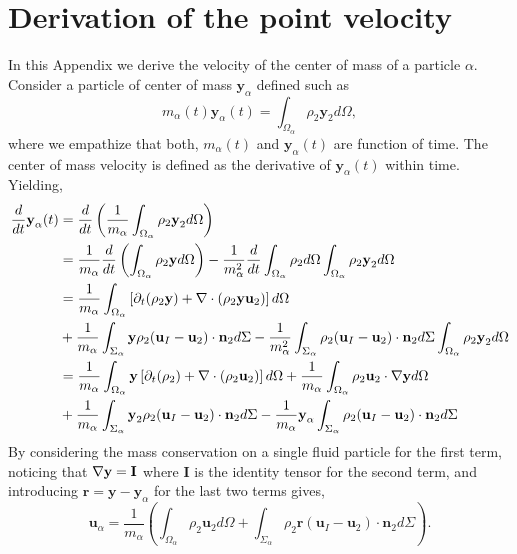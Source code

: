 \section{Derivation of the point velocity}
\label{ap:velocity_definition}
In this Appendix we derive the velocity of the center of mass of a particle $\alpha$. Consider a particle of center of mass $\textbf{y}_\alpha$ defined such as
\begin{equation*}
    m_\alpha(t) \textbf{y}_\alpha(t)
    = \int_{\Omega_\alpha} \rho_2 \textbf{y}_2 d\Omega,
\end{equation*}
where we empathize that both, $m_\alpha(t)$ and $\textbf{y}_\alpha(t)$ are function of time. 
The center of mass velocity is defined as the derivative of $\textbf{y}_\alpha(t)$ within time.
Yielding, 
\begin{align*}
    \frac{d}{d t} \textbf{y}_\alpha (t)
    &=
    \frac{d}{d t} \left(
        \frac{1}{m_\alpha} \int_{\Omega_\alpha} \rho_2 \textbf{y}_2 d\Omega
    \right)\\
    &= \frac{1}{m_\alpha}
    \frac{d}{d t} 
    \left(
        \int_{\Omega_\alpha} \rho_2 \textbf{y} d\Omega
    \right)
    - \frac{1}{m_\alpha^2} \frac{d}{d t} \int_{\Omega_\alpha} \rho_2 d\Omega \int_{\Omega_\alpha} \rho_2 \textbf{y}_2 d\Omega
    \\
    &= \frac{1}{m_\alpha}\int_{\Omega_\alpha} \left[
        \partial_t (\rho_2 \textbf{y}) + \mathbf{\nabla}\cdot\left(\rho_2 \textbf{y}\textbf{u}_2\right) 
    \right]d\Omega \\
    &+ \frac{1}{m_\alpha}\int_{\Sigma_\alpha} \textbf{y} \rho_2(\textbf{u}_I   - \textbf{u}_2) \cdot \textbf{n}_2 d \Sigma
    -  \frac{1}{m_\alpha^2} \int_{\Sigma_\alpha} \rho_2(\textbf{u}_I   - \textbf{u}_2) \cdot \textbf{n}_2 d\Sigma  \int_{\Omega_\alpha} \rho_2 \textbf{y}_2 d\Omega
    \\
    &= \frac{1}{m_\alpha}\int_{\Omega_\alpha} \textbf{y} \left[
    \partial_t (\rho_2) + \mathbf{\nabla}\cdot\left(\rho_2 \textbf{u}_2\right) 
    \right]d\Omega
    + \frac{1}{m_\alpha}\int_{\Omega_\alpha} \rho_2  \textbf{u}_2  \cdot \mathbf{\nabla} \textbf{y} d\Omega \\
    &+ \frac{1}{m_\alpha}\int_{\Sigma_\alpha} \textbf{y}_2 \rho_2 (\textbf{u}_I - \textbf{u}_2) \cdot \textbf{n}_2 d \Sigma
    - \frac{1}{m_\alpha}  \textbf{y}_\alpha \int_{\Sigma_\alpha} \rho_2(\textbf{u}_I   - \textbf{u}_2) \cdot \textbf{n}_2 d\Sigma
\end{align*}
By considering the mass conservation on a single fluid particle for the first term, noticing that $\mathbf{\nabla} \textbf{y} = \textbf{I}$ where $\textbf{I}$ is the identity tensor for the second term, and introducing $\mathbf{r} = \mathbf{y} - \mathbf{y}_\alpha$ for the last two terms gives, 
\begin{equation*}
    \textbf{u}_\alpha
    = \frac{1}{m_\alpha} \left(
        \int_{\Omega_\alpha} \rho_2 \textbf{u}_2 d\Omega
        +  \int_{\Sigma_\alpha} \rho_2 \textbf{r}  (\textbf{u}_I - \textbf{u}_2) \cdot \textbf{n}_2 d\Sigma
    \right).
    \label{eq:vel_def}
\end{equation*}

